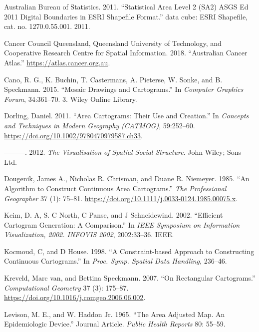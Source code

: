 \hypertarget{refs}{}
\begin{CSLReferences}{1}{0}
\leavevmode{}%
Australian Bureau of Statistics. 2011. {``{Statistical Area Level 2 (SA2) ASGS Ed 2011 Digital Boundaries in ESRI Shapefile Format}.''} data cube: ESRI Shapefile, cat. no. 1270.0.55.001. 2011.

\leavevmode{}%
Cancer Council Queensland, Queensland University of Technology, and Cooperative Research Centre for Spatial Information. 2018. {``{Australian Cancer Atlas}.''} \url{https://atlas.cancer.org.au}.

\leavevmode{}%
Cano, R. G., K. Buchin, T. Castermans, A. Pieterse, W. Sonke, and B. Speckmann. 2015. {``{Mosaic Drawings and Cartograms}.''} In \emph{Computer Graphics Forum}, 34:361--70. 3. Wiley Online Library.

\leavevmode{}%
Dorling, Daniel. 2011. {``Area Cartograms: Their Use and Creation.''} In \emph{Concepts and Techniques in Modern Geography (CATMOG)}, 59:252--60. \url{https://doi.org/10.1002/9780470979587.ch33}.

\leavevmode{}%
---------. 2012. \emph{{The Visualisation of Spatial Social Structure}}. John Wiley; Sons Ltd.

\leavevmode{}%
Dougenik, James A., Nicholas R. Chrisman, and Duane R. Niemeyer. 1985. {``{An Algorithm to Construct Continuous Area Cartograms}.''} \emph{The Professional Geographer} 37 (1): 75--81. \url{https://doi.org/10.1111/j.0033-0124.1985.00075.x}.

\leavevmode{}%
Keim, D. A, S. C North, C Panse, and J Schneidewind. 2002. {``{Efficient Cartogram Generation: A Comparison}.''} In \emph{{IEEE Symposium on Information Visualization, 2002. INFOVIS 2002}}, 2002:33--36. IEEE.

\leavevmode{}%
Kocmoud, C, and D House. 1998. {``{A Constraint-based Approach to Constructing Continuous Cartograms}.''} In \emph{Proc. Symp. Spatial Data Handling}, 236--46.

\leavevmode{}%
Kreveld, Marc van, and Bettina Speckmann. 2007. {``On {R}ectangular {C}artograms.''} \emph{{Computational Geometry}} 37 (3): 175--87. \url{https://doi.org/10.1016/j.comgeo.2006.06.002}.

\leavevmode{}%
Levison, M. E., and W. Haddon Jr. 1965. {``{The Area Adjusted Map. An Epidemiologic Device}.''} Journal Article. \emph{Public Health Reports} 80: 55--59.


\end{CSLReferences}

